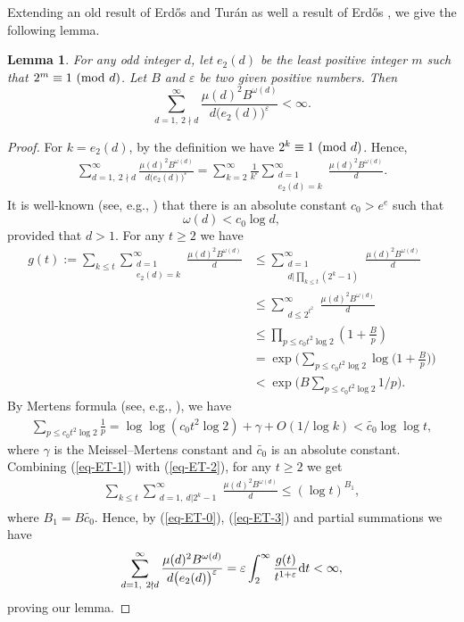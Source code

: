 \documentclass[12pt,a4paper,reqno]{amsart}
\numberwithin{equation}{section}
\def\pmod #1{\ ({\rm{mod}}\ #1)}
\theoremstyle{plain}
\newtheorem{lemma}{Lemma}
\theoremstyle{definition}
\begin{document}
Extending an old result of Erd\H os and Tur\'an \cite{Erdos-Turan} as well a result of Erd\H os \cite[Eq. (14)]{Erdos2}, we give the following lemma.

\begin{lemma}\label{lem-ET}
For any odd integer $d$, let $e_2(d)$ be the least positive integer $m$ such that $2^m\equiv 1\pmod{d}$. Let $B$ and $\varepsilon$ be two given positive numbers. Then
$$
\sum_{d=1,\ 2\nmid d}^{\infty}\frac{\mu(d)^2B^{\omega(d)}}{d\big(e_2(d)\big)^\varepsilon}<\infty.
$$
\end{lemma}
\begin{proof}
For $k=e_2(d)$, by the definition we have $2^k\equiv 1\pmod{d}$. Hence,
\begin{align}\label{eq-ET-0}
\sum_{d=1,\ 2\nmid d}^{\infty}\frac{\mu(d)^2B^{\omega(d)}}{d\big(e_2(d)\big)^\varepsilon}=\sum_{k=2}^{\infty}\frac{1}{k^\varepsilon}\sum_{\substack{d=1\\ e_2(d)=k}}^{\infty}\frac{\mu(d)^2B^{\omega(d)}}{d}.
\end{align}
It is well-known (see, e.g., \cite{Montgomery2}) that there is an absolute constant $c_0>e^e$ such that
$$
\omega(d)<c_0\log d,
$$
provided that $d>1$. For any $t\ge 2$ we have
\begin{align}\label{eq-ET-1}
g(t):=\sum_{k\le t}\sum_{\substack{d=1\\ e_2(d)=k}}^{\infty}\frac{\mu(d)^2B^{\omega(d)}}{d}&\le \sum_{\substack{d=1\\ d| \prod_{k\le t}\left(2^k-1\right)}}^{\infty}\frac{\mu(d)^2B^{\omega(d)}}{d}\nonumber\\
&\le \sum_{\substack{d\le 2^{t^2}}}^{\infty}\frac{\mu(d)^2B^{\omega(d)}}{d}\nonumber\\
&\le \prod_{p\le c_0t^2\log 2}\left(1+\frac{B}{p}\right)\nonumber\\
&=\exp\bigg(\sum_{p\le c_0t^2\log 2}\log \Big(1+\frac{B}{p}\Big)\bigg)\nonumber\\
&<\exp\Big(B\sum_{p\le c_0t^2\log 2} 1/p\Big).
\end{align}
By Mertens formula (see, e.g.,  \cite[Theorem 2.7]{Montgomery2}),  we have
\begin{align}\label{eq-ET-2}
\sum_{p\le c_0t^2\log 2}\frac{1}{p}=\log\log (c_0t^2\log 2)+\gamma+O(1/\log k)< \widetilde{c_0}\log\log t,
\end{align}
where $\gamma$ is the Meissel–Mertens constant and $\widetilde{c_0}$ is an absolute constant.
Combining (\ref{eq-ET-1}) with (\ref{eq-ET-2}), for any $t\ge 2$ we get
\begin{align}\label{eq-ET-3}
\sum_{k\le t}\sum_{\substack{d=1,\ d|2^k-1}}^{\infty}\frac{\mu(d)^2B^{\omega(d)}}{d}\le (\log t)^{B_1},
\end{align}
where $B_1=B\widetilde{c_0}$. Hence, by (\ref{eq-ET-0}), (\ref{eq-ET-3}) and partial summations we have
\begin{align*}
\sum_{d=1,\ 2\nmid d}^{\infty}\frac{\mu(d)^2B^{\omega(d)}}{d\big(e_2(d)\big)^\varepsilon}=\varepsilon\int_{2}^{\infty}
\frac{g(t)}{t^{1+\varepsilon}}{\rm d}t<\infty,
\end{align*}
proving our lemma.
\end{proof}
\end{document}

